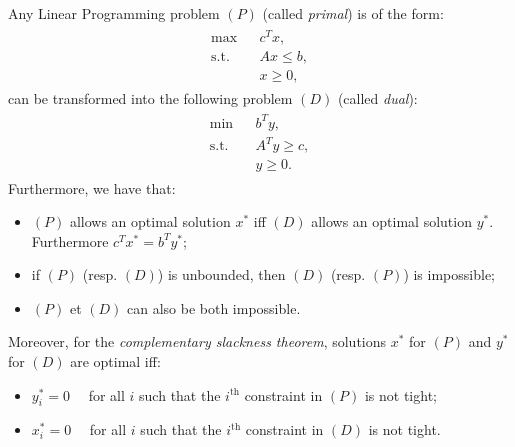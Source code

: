 \documentclass[a4paper,notitlepage,12pt]{article}
\begin{document}
\begin{itemize}[leftmargin=*]
	Any Linear Programming problem $(P)$ (called \emph{primal}) is of the form:
	\begin{align*}
		\begin{array}{lll}
			\max && c^T x, \\ 
			\mbox{s.t.} && Ax \leq b, \\
			&& x \geq 0,
		\end{array}
	\end{align*} 
	can be transformed into the following problem $(D)$ (called \emph{dual}):
	\begin{align*}
		\begin{array}{lll}
			\min && b^T y, \\ 
			\mbox{s.t.} && A^T y \geq c, \\
			&& y \geq 0.
		\end{array}
	\end{align*} 
	Furthermore, we have that:
	\begin{itemize}
		\item $(P)$ allows an optimal solution $x^*$ iff $(D)$ allows an optimal solution $y^*$. Furthermore $c^T x^* = b^T y^*$;
		\item if $(P)$ (resp. $(D)$) is unbounded, then $(D)$ (resp. $(P)$) is impossible;
		\item $(P)$ et $(D)$ can also be both impossible.
	\end{itemize}
	\vspace{.5cm}
	Moreover, for the \emph{complementary slackness theorem}, solutions $x^*$ for $(P)$ and $y^*$ for $(D)$ are optimal iff:
	\begin{itemize}
		\item $y_i^* = 0 \quad$ for all $i$ such that the $i^{\text{th}}$ constraint in $(P)$ is not tight;
		\item $x_i^* = 0 \quad$ for all $i$ such that the $i^{\text{th}}$ constraint in $(D)$ is not tight.
	\end{itemize}
		
\end{itemize}
\end{document}
